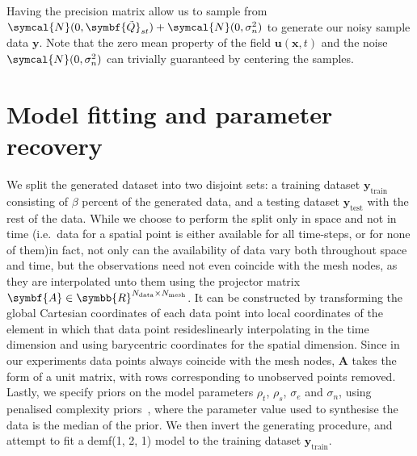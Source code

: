 \documentclass[british]{scrreprt}
\begin{document}
Having the precision matrix allow us to sample from \( \symcal{N}(0, \symbf{\tilde{Q}}_{st}) + \symcal{N}(0, \sigma_{n}^{2}) \) to generate our noisy sample data \( \symbf{y} \). Note that the zero mean property of the field \( \symbf{u}(\symbf{x}, t) \) and the noise \( \symcal{N}(0, \sigma_{n}^{2}) \) can trivially guaranteed by centering the samples.

\section{Model fitting and parameter recovery}
\label{sec:fitting}
We split the generated dataset into two disjoint sets: a training dataset \( \symbf{y}_{\text{train}} \) consisting of \( \beta \) percent of the generated data, and a testing dataset \( \symbf{y}_{\text{test}} \) with the rest of the data. While we choose to perform the split only in space and not in time (i.e.\ data for a spatial point is either available for all time-steps, or for none of them)\textemdash{}in fact, not only can the availability of data vary both throughout space and time, but the observations need not even coincide with the mesh nodes, as they are interpolated unto them using the projector matrix \( \symbf{A} \in \symbb{R}^{N_{\text{data}} \times N_{\text{mesh}}} \). It can be constructed by transforming the global Cartesian coordinates of each data point into local coordinates of the element in which that data point resides\textemdash{}linearly interpolating in the time dimension and using barycentric coordinates for the spatial dimension. Since in our experiments data points always coincide with the mesh nodes, \( \symbf{A} \) takes the form of a unit matrix, with rows corresponding to unobserved points removed. Lastly, we specify priors on the model parameters \( \rho_{t} \), \( \rho_{s} \), \( \sigma_{e} \) and \( \sigma_{n} \), using penalised complexity priors~\cite{FuglstadConstructingpriorsthat2019}, where the parameter value used to synthesise the data is the median of the prior. We then invert the generating procedure, and attempt to fit a \gls{demf}(1, 2, 1) model to the training dataset \( \symbf{y}_{\text{train}} \).
\end{document}
